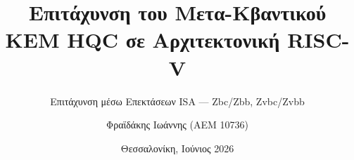 


\newcommand{\HQC}{\textsc{HQC}\xspace}
\newcommand{\KeyGen}{\textsc{KeyGen}\xspace}
\newcommand{\Encaps}{\textsc{Encaps}\xspace}
\newcommand{\Decaps}{\textsc{Decaps}\xspace}
\newcommand{\ext}[1]{\textsf{#1}}
\newcommand{\insn}[1]{\texttt{#1}\xspace}
\newcommand{\clmul}{\insn{clmul}}
\newcommand{\clmulh}{\insn{clmulh}}
\newcommand{\vclmul}{\insn{vclmul.vx}}
\newcommand{\vclmulh}{\insn{vclmulh.vx}}
\newcommand{\vror}{\insn{vror}}
\newcommand{\rori}{\insn{rori}}
\newcommand{\Zbc}{\ext{Zbc}\xspace}
\newcommand{\Zbb}{\ext{Zbb}\xspace}
\newcommand{\Zba}{\ext{Zba}\xspace}
\newcommand{\Zvbc}{\ext{Zvbc}\xspace}
\newcommand{\Zvbb}{\ext{Zvbb}\xspace}
\newcommand{\RVV}{\textsc{RVV}\xspace}
\newcommand{\instret}{\texttt{instret}\xspace}
\newcommand{\VLEN}{\texttt{VLEN}\xspace}
\newcommand{\code}[1]{\texttt{#1}}
\newcommand{\speedup}[1]{$\times$#1}
\newcommand{\insnreduction}[1]{$\times$#1}
\newcommand{\cycles}[1]{\num{#1}}
\newcommand{\pct}[1]{\SI{#1}{\percent}}

\title{Επιτάχυνση του Μετα-Κβαντικού KEM \HQC σε Αρχιτεκτονική RISC-V}
\subtitle{Επιτάχυνση μέσω Επεκτάσεων ISA — \Zbc/\Zbb, \Zvbc/\Zvbb}
\author{Φραϊδάκης Ιωάννης (ΑΕΜ 10736)}
\date{Θεσσαλονίκη, Ιούνιος 2026}

\newif\ifincludeCT
\includeCTfalse
